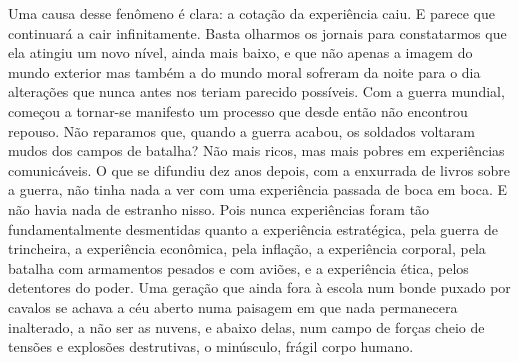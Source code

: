 Uma causa desse fenômeno é clara: a cotação da experiência caiu. E
parece que continuará a cair infinitamente. Basta olharmos os jornais
para constatarmos que ela atingiu um novo nível, ainda mais baixo, e que não
apenas a imagem do mundo exterior mas também a do mundo moral sofreram
da noite para o dia alterações que nunca antes nos teriam parecido
possíveis. Com a guerra mundial, começou a tornar-se manifesto um
processo que desde então não encontrou repouso. Não reparamos que,
quando a guerra acabou, os soldados voltaram mudos dos campos de
batalha? Não mais ricos, mas mais pobres em experiências comunicáveis. O
que se difundiu dez anos depois, com a enxurrada de livros sobre a
guerra, não tinha nada a ver com uma experiência passada de boca em
boca. E não havia nada de estranho nisso. Pois nunca experiências foram
tão fundamentalmente desmentidas quanto a experiência estratégica, pela
guerra de trincheira, a experiência econômica, pela inflação, a
experiência corporal, pela batalha com armamentos pesados e com aviões,
e a experiência ética, pelos detentores do poder. Uma geração que ainda
fora à escola num bonde puxado por cavalos se achava a céu aberto numa
paisagem em que nada permanecera inalterado, a não ser as nuvens, e
abaixo delas, num campo de forças cheio de tensões e explosões
destrutivas, o minúsculo, frágil corpo humano.

\section{}

